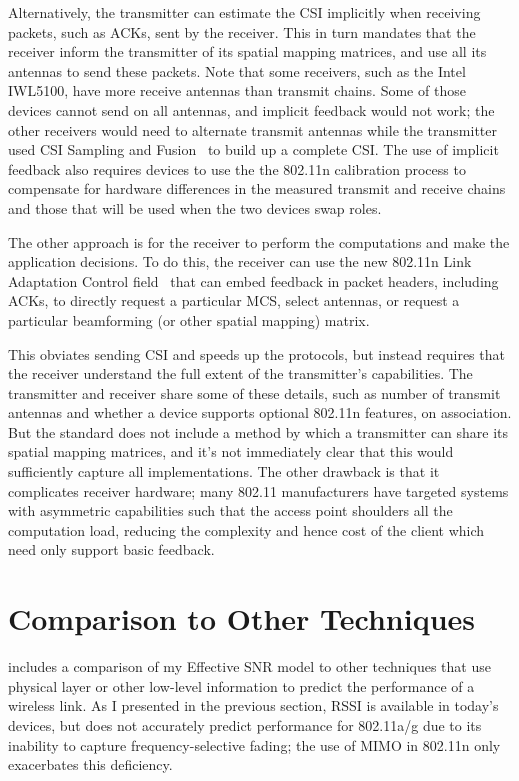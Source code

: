 Alternatively, the transmitter can estimate the CSI implicitly when receiving packets, such as ACKs, sent by the receiver. This in turn mandates that the receiver inform the transmitter of its spatial mapping matrices, and use all its antennas to send these packets. Note that some receivers, such as the Intel IWL5100, have more receive antennas than transmit chains. Some of those devices cannot send on all antennas, and implicit feedback would not work; the other receivers would need to alternate transmit antennas while the transmitter used CSI Sampling and Fusion~\cite{Crepaldi_CSI_SF} to build up a complete CSI. The use of implicit feedback also requires devices to use the the 802.11n calibration process to compensate for hardware differences in the measured transmit and receive chains and those that will be used when the two devices swap roles.

 The other approach is for the receiver to perform the computations and make the application decisions. To do this, the receiver can use the new 802.11n Link Adaptation Control field~\cite[\S7.1.3.5a]{80211n} that can embed feedback in packet headers, including ACKs, to directly request a particular MCS, select antennas, or request a particular beamforming (or other spatial mapping) matrix.

This obviates sending CSI and speeds up the protocols, but instead requires that the receiver understand the full extent of the transmitter's capabilities. The transmitter and receiver share some of these details, such as number of transmit antennas and whether a device supports optional 802.11n features, on association. But the standard does not include a method by which a transmitter can share its spatial mapping matrices, and it's not immediately clear that this would sufficiently capture all implementations. The other drawback is that it complicates receiver hardware; many 802.11 manufacturers have targeted systems with asymmetric capabilities such that the access point shoulders all the computation load, reducing the complexity and hence cost of the client which need only support basic feedback.

\section{Comparison to Other Techniques}
 includes a comparison of my Effective SNR model to other techniques that use physical layer or other low-level information to predict the performance of a wireless link. As I presented in the previous section, RSSI is available in today's devices, but does not accurately predict performance for 802.11a/g due to its inability to capture frequency-selective fading; the use of MIMO in 802.11n only exacerbates this deficiency.

